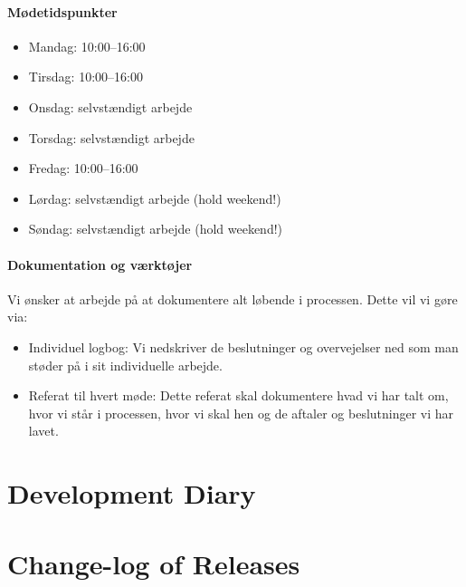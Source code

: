 \documentclass[11pt]{article}
\begin{document}
\paragraph{Mødetidspunkter} 

\begin{itemize}
    \item Mandag: 10:00--16:00
    \item Tirsdag: 10:00--16:00
    \item Onsdag: selvstændigt arbejde
    \item Torsdag: selvstændigt arbejde
    \item Fredag: 10:00--16:00
    \item Lørdag: selvstændigt arbejde (hold weekend!) 
    \item Søndag: selvstændigt arbejde (hold weekend!)
\end{itemize}

\paragraph{Dokumentation og værktøjer}
Vi ønsker at arbejde på at dokumentere alt løbende i processen. Dette vil vi gøre via:
\begin{itemize}
    \item Individuel logbog: Vi nedskriver de beslutninger og overvejelser ned som man støder på i sit individuelle arbejde.
    \item Referat til hvert møde: Dette referat skal dokumentere hvad vi har talt om, hvor vi står i processen, hvor vi skal hen og de aftaler og beslutninger vi har lavet.
\end{itemize}

\section{Development Diary}

\section{Change-log of Releases}
\end{document}
